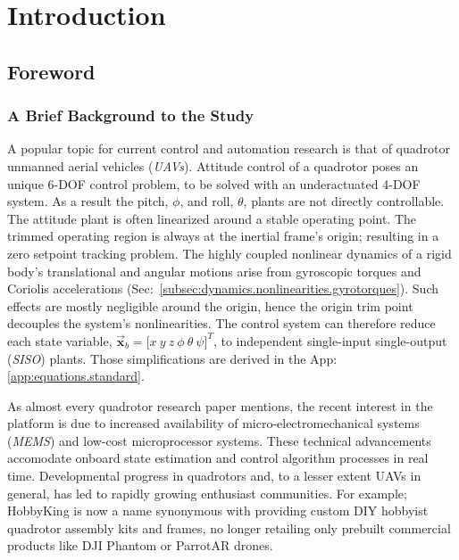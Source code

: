 \chapter{Introduction}
\label{ch:intro}
\section{Foreword}
\label{sec:intro.foreword}
\subsection{A Brief Background to the Study}
\label{subsec:intro.foreword.background}
A popular topic for current control and automation research is that of quadrotor unmanned aerial vehicles (\emph{UAVs}). Attitude control of a quadrotor poses an unique 6-DOF control problem, to be solved with an underactuated 4-DOF system. As a result the pitch, $\phi$, and roll, $\theta$, plants are not directly controllable. The attitude plant is often linearized around a stable operating point. The trimmed operating region is always at the inertial frame's origin; resulting in a zero setpoint tracking problem. The highly coupled nonlinear dynamics of a rigid body's translational and angular motions arise from gyroscopic torques and Coriolis accelerations (Sec:~\ref{subsec:dynamics.nonlinearities.gyrotorques}). Such effects are mostly negligible around the origin, hence the origin trim point decouples the system's nonlinearities. The control system can therefore reduce each state variable, $\vec{\mathbf{x}}_b=\big[x~y~z~\phi~\theta~\psi\big]^T$, to independent single-input single-output (\emph{SISO}) plants. Those simplifications are derived in the App:\ref{app:equations.standard}.
\par
As almost every quadrotor research paper mentions, the recent interest in the platform is due to increased availability of micro-electromechanical systems (\emph{MEMS}) and low-cost microprocessor systems. These technical advancements accomodate onboard state estimation and control algorithm processes in real time. Developmental progress in quadrotors and, to a lesser extent UAVs in general, has led to rapidly growing enthusiast communities. For example; HobbyKing\cite{hobbyking} is now a name synonymous with providing custom DIY hobbyist quadrotor assembly kits and frames, no longer retailing only prebuilt commercial products like DJI Phantom\cite{phantom} or ParrotAR\cite{parrotar} drones.
